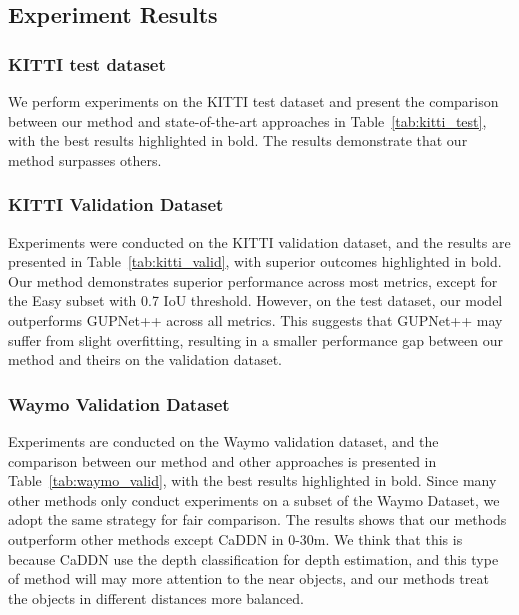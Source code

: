 \documentclass[journal]{IEEEtran}
\begin{document}
	\subsection{Experiment Results}
	\subsubsection{KITTI test dataset}
	We perform experiments on the KITTI test dataset and present the comparison between our method and state-of-the-art approaches in Table~\ref{tab:kitti_test}, with the best results highlighted in bold. The results demonstrate that our method surpasses others.
	
	\subsubsection{KITTI Validation Dataset}
	
	Experiments were conducted on the KITTI validation dataset, and the results are presented in Table~\ref{tab:kitti_valid}, with superior outcomes highlighted in bold. Our method demonstrates superior performance across most metrics, except for the Easy subset with 0.7 IoU threshold. However, on the test dataset, our model outperforms GUPNet++ across all metrics. This suggests that GUPNet++ may suffer from slight overfitting, resulting in a smaller performance gap between our method and theirs on the validation dataset.
	
	\subsubsection{Waymo Validation Dataset}
	
	Experiments are conducted on the Waymo validation dataset, and the comparison between our method and other approaches is presented in Table~\ref{tab:waymo_valid}, with the best results highlighted in bold. Since many other methods only conduct experiments on a subset of the Waymo Dataset, we adopt the same strategy for fair comparison. The results shows that our methods outperform other methods except CaDDN in 0-30m. We think that this is because CaDDN use the depth classification for depth estimation, and this type of method will may more attention to the near objects, and our methods treat the objects in different distances more balanced.
	
\end{document}
